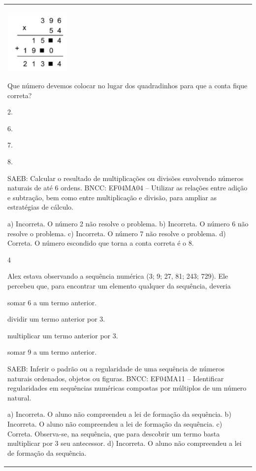 \begin{mdframed}[linewidth=2pt,linecolor=salmao,roundcorner=2pt]
\begin{escolha}
{{{\begin{longtable}[]{@{}l@{}}
\begin{itemize}
{\includegraphics[width=1.26282in,height=1.25762in]{media/image159.png}

Que número devemos colocar no lugar dos quadradinhos para que a conta
fique correta?

\begin{escolha}
\item
  2.
\item
  6.
\item
  7.
\item
  8.
\end{escolha}

SAEB: Calcular o resultado de multiplicações ou divisões
envolvendo números naturais de até 6 ordens.
BNCC: EF04MA04 -- Utilizar as relações entre adição e subtração, bem como entre multiplicação e divisão,
para ampliar as estratégias de cálculo.

a) Incorreta. O número 2 não resolve o problema.
b) Incorreta. O número 6 não resolve o problema.
c) Incorreta. O número 7 não resolve o problema.
d) Correta. O número escondido que torna a conta correta é o 8.

\num{4}

Alex estava observando a sequência numérica (3; 9; 27, 81; 243; 729).
Ele percebeu que, para encontrar um elemento qualquer da sequência,
deveria

\begin{escolha}
\item
  somar 6 a um termo anterior.
\item
  dividir um termo anterior por 3.
\item
  multiplicar um termo anterior por 3.
\item
  somar 9 a um termo anterior.
\end{escolha}

SAEB: Inferir o padrão ou a regularidade de uma sequência de
números naturais ordenados, objetos ou figuras.
BNCC: EF04MA11 -- Identificar regularidades em sequências numéricas compostas por múltiplos de um
número natural.

a) Incorreta. O aluno não compreendeu a lei de formação da sequência.
b) Incorreta. O aluno não compreendeu a lei de formação da sequência.
c) Correta. Observa-se, na sequência, que para descobrir um termo basta
multiplicar por 3 seu antecessor.
d) Incorreta. O aluno não compreendeu a lei de formação da sequência.

}
\end{itemize}
\end{longtable}}}}
\end{escolha}
\end{mdframed}
